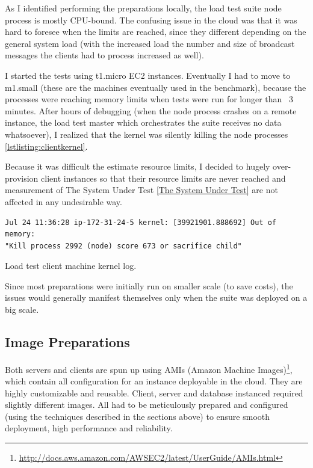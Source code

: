 \documentclass{uvamscse}
\begin{document}
As I identified performing the preparations locally, the load test suite node process is mostly CPU-bound. The confusing issue in the cloud was that it was hard to foresee when the limits are reached, since they different depending on the general system load (with the increased load the number and size of broadcast messages the clients had to process increased as well).

I started the tests using t1.micro EC2 instances. Eventually I had to move to m1.small (these are the machines eventually used in the benchmark), because the processes were reaching memory limits when tests were run for longer than ~3 minutes. After hours of debugging (when the node process crashes on a remote instance, the load test master which orchestrates the suite receives no data whatsoever), I realized that the kernel was silently killing the node processes \ref{lstlisting:clientkernel}.

Because it was difficult the estimate resource limits, I decided to hugely over-provision client instances so that their resource limits are never reached and measurement of The System Under Test \ref{The System Under Test} are not affected in any undesirable way.

\begin{sourcecode}[h]
\begin{lstlisting}[style=mono]
Jul 24 11:36:28 ip-172-31-24-5 kernel: [39921901.888692] Out of memory:
"Kill process 2992 (node) score 673 or sacrifice child"
\end{lstlisting}
\caption{Load test client machine kernel log.}
\label{lstlisting:clientkernel}
\end{sourcecode}

Since most preparations were initially run on smaller scale (to save costs), the issues would generally manifest themselves only when the suite was deployed on a big scale.

\subsection{Image Preparations}
Both servers and clients are spun up using AMIs (Amazon Machine Images)\footnote{\url{http://docs.aws.amazon.com/AWSEC2/latest/UserGuide/AMIs.html}}, which contain all configuration for an instance deployable in the cloud. They are highly customizable and reusable. Client, server and database instanced required slightly different images. All had to be meticulously prepared and configured (using the techniques described in the sections above) to ensure smooth deployment, high performance and reliability.
\end{document}
